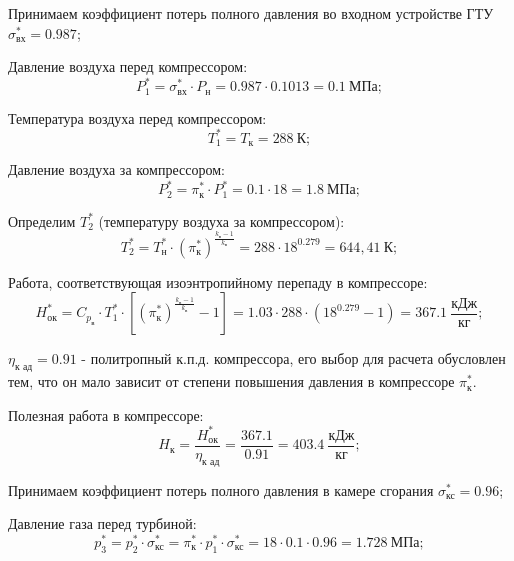 Принимаем коэффициент потерь полного давления во входном устройстве ГТУ $\sigma^*_{\text{вх}}=0.987$;

Давление воздуха перед компрессором:
\begin{equation} \label{eu_eqn}
	P_{1}^*=\sigma_{\text{вх}}^*\cdot P_{\text{н}}=0.987\cdot 0.1013=0.1 \ \text{МПа};
\end{equation}

Температура воздуха перед компрессором:
\begin{equation} \label{eu_eqn}
	T_{1}^*=T_{\text{к}}=288 \ \text{К};
\end{equation}

Давление воздуха за компрессором:
\begin{equation} \label{eu_eqn}
	P_{2}^*=\pi_{\text{к}}^*\cdot P_{1}^*=0.1\cdot 18=1.8 \ \text{МПа};
\end{equation}

Определим $T_2^*$ (температуру воздуха за компрессором):
\begin{equation} \label{eu_eqn}
	T_{2}^*=T_{\text{н}}^*\cdot(\pi_{\text{к}}^*)^{\frac{k_{\text{в}}-1}{k_{\text{в}}}}=288\cdot 18^{0.279}=644,41 \ \text{К};
\end{equation}

Работа, соответствующая изоэнтропийному перепаду в компрессоре:
\begin{equation} \label{eu_eqn}
H_{\text{ок}}^*=C_{p_{\text{в}}}\cdot T_{1}^*\cdot\left[ (\pi_{\text{к}}^*)^{\frac{k_{\text{в}}-1}{k_{\text{в}}}}-1 \right]=1.03\cdot 288 \cdot (18^{0.279}-1)=367.1 \ \dfrac{\text{кДж}}{\text{кг}};
\end{equation}

$\eta_{\text{к ад}}=0.91$ - политропный к.п.д. компрессора, его выбор для расчета обусловлен тем, что он мало зависит от степени повышения давления в компрессоре $\pi^*_{\text{к}}$.

Полезная работа в компрессоре:
\begin{equation} \label{eu_eqn}
	H_{\text{к}}=\dfrac{H_{\text{ок}}^*}{\eta_{\text{к ад}}}=\dfrac{367.1}{0.91}=403.4 \  \dfrac{\text{кДж}}{\text{кг}};
\end{equation}

Принимаем коэффициент потерь полного давления в камере сгорания $\sigma^*_{\text{кс}}=0.96$;

Давление газа перед турбиной:
\begin{equation} \label{eu_eqn}
	p_{3}^*=p_{2}^* \cdot \sigma^*_{\text{кс}}= \pi_{\text{к}}^* \cdot p_{1}^* \cdot \sigma^*_{\text{кс}}=18\cdot 0.1 \cdot0.96=1.728 \ \text{МПа};
\end{equation}

